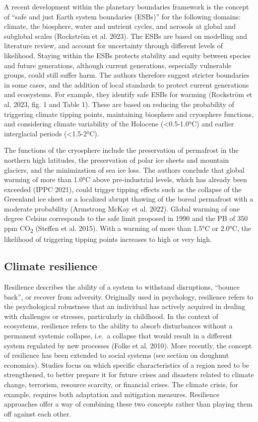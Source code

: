 \documentclass[
  a4paper,
  openany]{book}
\begin{document}
A recent development within the planetary boundaries framework is the
concept of ``safe and just Earth system boundaries (ESBs)'' for the
following domains: climate, the biosphere, water and nutrient cycles,
and aerosols at global and subglobal scales (Rockström et al. 2023). The
ESBs are based on modelling and literature review, and account for
uncertainty through different levels of likelihood. Staying within the
ESBs protects stability and equity between species and future
generations, although current generations, especially vulnerable groups,
could still suffer harm. The authors therefore suggest stricter
boundaries in some cases, and the addition of local standards to protect
current generations and ecosystems. For example, they identify safe ESBs
for warming (Rockström et al. 2023, fig. 1 and Table 1). These are based
on reducing the probability of triggering climate tipping points,
maintaining biosphere and cryosphere functions, and considering climate
variability of the Holocene (\textless0.5-1.0°C) and earlier
interglacial periods (\textless1.5-2°C).

The functions of the cryosphere include the preservation of permafrost
in the northern high latitudes, the preservation of polar ice sheets and
mountain glaciers, and the minimization of sea ice loss. The authors
conclude that global warming of more than 1.0°C above pre-industrial
levels, which has already been exceeded (IPPC 2021), could trigger
tipping effects such as the collapse of the Greenland ice sheet or a
localized abrupt thawing of the boreal permafrost with a moderate
probability (Armstrong McKay et al. 2022). Global warming of one degree
Celsius corresponds to the safe limit proposed in 1990 and the PB of 350
ppm CO\textsubscript{2} (Steffen et al. 2015). With a warming of more
than 1.5°C or 2.0°C, the likelihood of triggering tipping points
increases to high or very high.

\subsection{Climate resilience}\label{climate-resilience}

Resilience describes the ability of a system to withstand disruptions,
``bounce back'', or recover from adversity. Originally used in
psychology, resilience refers to the psychological robustness that an
individual has actively acquired in dealing with challenges or stresses,
particularly in childhood. In the context of ecosystems, resilience
refers to the ability to absorb disturbances without a permanent
systemic collapse, i.e.~a collapse that would result in a different
system regulated by new processes (Folke et al. 2010). More recently,
the concept of resilience has been extended to social systems (see
section on doughnut economics). Studies focus on which specific
characteristics of a region need to be strengthened, to better prepare
it for future crises and disasters related to climate change, terrorism,
resource scarcity, or financial crises. The climate crisis, for example,
requires both adaptation and mitigation measures. Resilience approaches
offer a way of combining these two concepts rather than playing them off
against each other.
\end{document}
